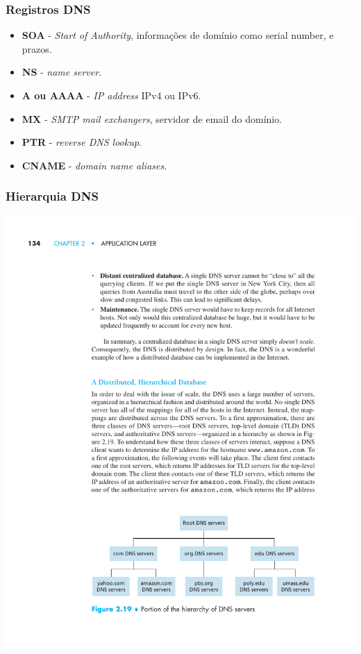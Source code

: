 \documentclass[xcolor=dvipsnames,10pt,compress,aspectratio=169]{beamer}
\begin{document}
\begin{frame}
  \frametitle{Registros DNS}
  \begin{itemize}
	  \item \textbf{SOA} -  \emph{Start of Authority}, informações de domínio como serial number, e prazos.
	  \item \textbf{NS} - \emph{name server}.
	  \item \textbf{A ou AAAA} - \emph{IP address} IPv4 ou IPv6.
	  \item \textbf{MX} - \emph{SMTP mail exchangers}, servidor de email do domínio.
	  \item \textbf{PTR} - \emph{reverse DNS lookup}.
	  \item \textbf{CNAME} - \emph{domain name aliases}.
  \end{itemize}
\end{frame}

\begin{frame}
  \frametitle{Hierarquia DNS}
  \begin{center}
  \includegraphics[scale=0.9]{kurose-02-19}
  \end{center}
\end{frame}
\end{document}
